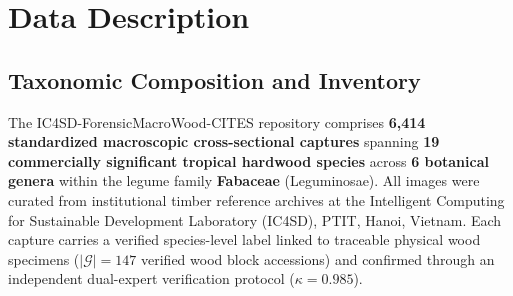 \documentclass[a4paper,fleqn,12pt]{cas-sc}
\begin{document}
\section{Data Description}
\label{sec:description}

\subsection{Taxonomic Composition and Inventory}

The IC4SD-ForensicMacroWood-CITES repository comprises \textbf{6,414 standardized macroscopic cross-sectional captures} spanning \textbf{19 commercially significant tropical hardwood species} across \textbf{6 botanical genera} within the legume family \textbf{Fabaceae} (Leguminosae). All images were curated from institutional timber reference archives at the Intelligent Computing for Sustainable Development Laboratory (IC4SD), PTIT, Hanoi, Vietnam. Each capture carries a verified species-level label linked to traceable physical wood specimens ($|\mathcal{G}| = 147$ verified wood block accessions) and confirmed through an independent dual-expert verification protocol ($\kappa = 0.985$).
\end{document}
